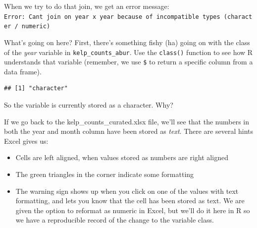 \documentclass[]{book}
\newenvironment{Shaded}{\begin{snugshade}}{\end{snugshade}}
\newcommand{\CommentTok}[1]{\textcolor[rgb]{0.56,0.35,0.01}{\textit{#1}}}
\newcommand{\KeywordTok}[1]{\textcolor[rgb]{0.13,0.29,0.53}{\textbf{#1}}}
\newcommand{\NormalTok}[1]{#1}
\newcommand{\OperatorTok}[1]{\textcolor[rgb]{0.81,0.36,0.00}{\textbf{#1}}}
\newcommand{\StringTok}[1]{\textcolor[rgb]{0.31,0.60,0.02}{#1}}
\providecommand{\tightlist}{%
  \setlength{\itemsep}{0pt}\setlength{\parskip}{0pt}}
\begin{document}
\begin{Shaded}
\end{Shaded}

When we try to do that join, we get an error message:
\texttt{Error:\ Can\textquotesingle{}t\ join\ on\ \textquotesingle{}year\textquotesingle{}\ x\ \textquotesingle{}year\textquotesingle{}\ because\ of\ incompatible\ types\ (character\ /\ numeric)}

What's going on here? First, there's something fishy (ha) going on with the class of the \emph{year} variable in \texttt{kelp\_counts\_abur}. Use the \texttt{class()} function to see how R understands that variable (remember, we use \texttt{\$} to return a specific column from a data frame).

\begin{Shaded}
\end{Shaded}

\begin{verbatim}
## [1] "character"
\end{verbatim}

So the variable is currently stored as a character. Why?

If we go back to the kelp\_counts\_curated.xlsx file, we'll see that the numbers in both the year and month column have been stored as \emph{text}. There are several hints Excel gives us:

\begin{itemize}
\tightlist
\item
  Cells are left aligned, when values stored as numbers are right aligned
\item
  The green triangles in the corner indicate some formatting
\item
  The warning sign shows up when you click on one of the values with text formatting, and lets you know that the cell has been stored as text. We are given the option to reformat as numeric in Excel, but we'll do it here in R so we have a reproducible record of the change to the variable class.
\end{itemize}
\end{document}
